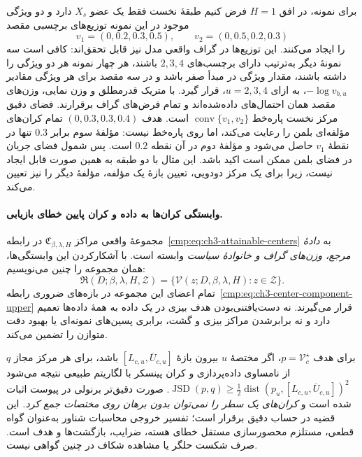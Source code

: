 برای نمونه، در افق $H=1$ فرض کنیم طبقهٔ نخست فقط یک عضو $X_s$ دارد و دو ویژگی موجود در این نمونه توزیع‌های برچسبی مقصد
\[
v_1=(0,0.2,0.3,0.5),\qquad v_2=(0,0.5,0.2,0.3)
\]
را ایجاد می‌کنند. این توزیع‌ها در گراف واقعی مدل نیز قابل تحقق‌اند: کافی است سه نمونهٔ دیگر به‌ترتیب دارای برچسب‌های $2,3,4$ باشند، هر چهار نمونه هر دو ویژگی را داشته باشند، مقدار ویژگی در مبدأ صفر باشد و در سه مقصد برای هر ویژگی مقادیر $-\log v_{b,u}$، به ازای $u=2,3,4$، قرار گیرد. با متریک قدرمطلق و وزن نمایی، وزن‌های مقصد همان احتمال‌های داده‌شده‌اند و تمام فرض‌های گراف برقرارند. فضای دقیق مرکز نخست پاره‌خط $\operatorname{conv}\{v_1,v_2\}$ است. هدف $(0,0.3,0.3,0.4)$ تمام کران‌های مؤلفه‌ای بلمن را رعایت می‌کند، اما روی پاره‌خط نیست: مؤلفهٔ سوم برابر $0.3$ تنها در نقطهٔ $v_1$ حاصل می‌شود و مؤلفهٔ دوم در آن نقطه $0.2$ است. پس شمول فضای جریان در فضای بلمن ممکن است اکید باشد. این مثال با دو طبقه به همین صورت قابل ایجاد نیست، زیرا برای یک مرکز دودویی، تعیین بازهٔ یک مؤلفه، مؤلفهٔ دیگر را نیز تعیین می‌کند.

\paragraph{وابستگی کران‌ها به داده و کران پایین خطای بازیابی.}
مجموعهٔ واقعی مراکز $\mathfrak C_{\beta,\lambda,H}$ در رابطه~\eqref{cmp:eq:ch3-attainable-centers} به \emph{دادهٔ مرجع، وزن‌های گراف و خانوادهٔ سیاست} وابسته است. با آشکارکردن این وابستگی‌ها، همان مجموعه را چنین می‌نویسیم:
\begin{equation}\label{cmp:eq:ch3-attainable-centers-data-explicit}
\mathfrak R(D;\beta,\lambda,H,\mathcal Z)
=\{\mathcal V(z;D,\beta,\lambda,H):z\in\mathcal Z\}.
\end{equation}
تمام اعضای این مجموعه در بازه‌های ضروری رابطه~\eqref{cmp:eq:ch3-center-component-upper} قرار می‌گیرند. نه دست‌یافتنی‌بودن هدف بیزی در یک داده به همهٔ داده‌ها تعمیم دارد و نه برابرشدن مراکز بیزی و گشت، برابری پسین‌های نمونه‌ای یا بهبود دقت متوازن را تضمین می‌کند.

برای هدف $p=\mathcal V_c^\star$، اگر مختصهٔ $u$ بیرون بازهٔ $[L_{c,u},\overline U_{c,u}]$ باشد، برای هر مرکز مجاز $q$ از نامساوی داده‌پردازی و کران پینسکر با لگاریتم طبیعی نتیجه می‌شود
$\operatorname{JSD}(p,q)\ge \frac12\operatorname{dist}(p_u,[L_{c,u},\overline U_{c,u}])^2$.
صورت دقیق‌تر برنولی در پیوست اثبات شده است و \emph{کران‌های یک سطر را نمی‌توان بدون برهان روی مختصات جمع کرد.}
این قضیه در حساب دقیق برقرار است؛ تفسیر خروجی محاسبات شناور به‌عنوان گواه قطعی، مستلزم محصورسازی مستقل خطای هسته، ضرایب، بازگشت‌ها و هدف است. صرف شکست حلگر یا مشاهده شکاف در  چنین گواهی نیست.

